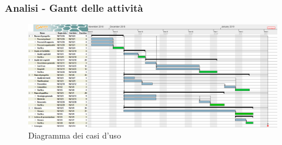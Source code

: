 \subsubsection{Analisi - Gantt delle attività}

\begin{figure} [H]
	\centering
	\includegraphics[scale=0.3]{Res/Gantt/Analisi}
	\caption{Diagramma dei casi d'uso}\label{}
\end{figure}

\pagebreak
